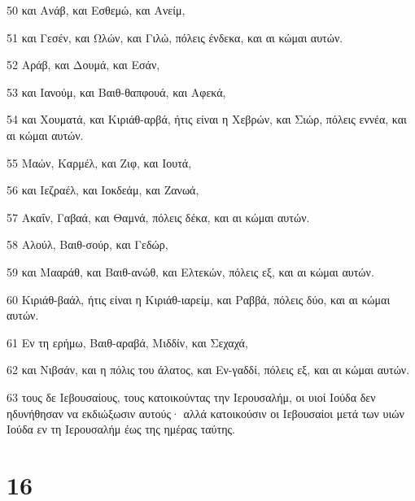 \par 50 και Ανάβ, και Εσθεμώ, και Ανείμ,
\par 51 και Γεσέν, και Ωλών, και Γιλώ, πόλεις ένδεκα, και αι κώμαι αυτών.
\par 52 Αράβ, και Δουμά, και Εσάν,
\par 53 και Ιανούμ, και Βαιθ-θαπφουά, και Αφεκά,
\par 54 και Χουματά, και Κιριάθ-αρβά, ήτις είναι η Χεβρών, και Σιώρ, πόλεις εννέα, και αι κώμαι αυτών.
\par 55 Μαών, Καρμέλ, και Ζιφ, και Ιουτά,
\par 56 και Ιεζραέλ, και Ιοκδεάμ, και Ζανωά,
\par 57 Ακαΐν, Γαβαά, και Θαμνά, πόλεις δέκα, και αι κώμαι αυτών.
\par 58 Αλούλ, Βαιθ-σούρ, και Γεδώρ,
\par 59 και Μααράθ, και Βαιθ-ανώθ, και Ελτεκών, πόλεις εξ, και αι κώμαι αυτών.
\par 60 Κιριάθ-βαάλ, ήτις είναι η Κιριάθ-ιαρείμ, και Ραββά, πόλεις δύο, και αι κώμαι αυτών.
\par 61 Εν τη ερήμω, Βαιθ-αραβά, Μιδδίν, και Σεχαχά,
\par 62 και Νιβσάν, και η πόλις του άλατος, και Εν-γαδδί, πόλεις εξ, και αι κώμαι αυτών.
\par 63 τους δε Ιεβουσαίους, τους κατοικούντας την Ιερουσαλήμ, οι υιοί Ιούδα δεν ηδυνήθησαν να εκδιώξωσιν αυτούς· αλλά κατοικούσιν οι Ιεβουσαίοι μετά των υιών Ιούδα εν τη Ιερουσαλήμ έως της ημέρας ταύτης.

\chapter{16}

